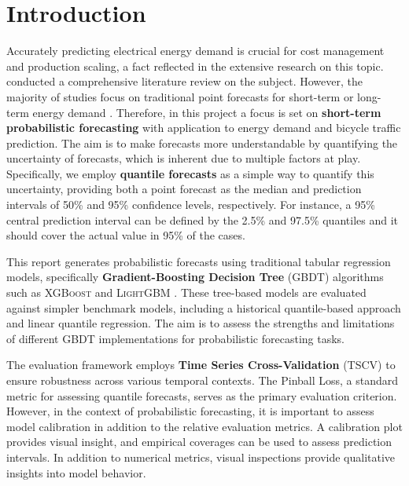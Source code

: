 \section{Introduction}
\label{ch:Introduction}

Accurately predicting electrical energy demand is crucial for cost management and production scaling, a fact reflected in the extensive research on this topic. \Cite{nti_electricity_2020} conducted a comprehensive literature review on the subject. However, the majority of studies focus on traditional point forecasts for short-term or long-term energy demand \parencite[915]{hong_probabilistic_2016}. Therefore, in this project a focus is set on \textbf{short-term probabilistic forecasting} with application to energy demand and bicycle traffic prediction. The aim is to make forecasts more understandable by quantifying the uncertainty of forecasts, which is inherent due to multiple factors at play. Specifically, we employ \textbf{quantile forecasts} as a simple way to quantify this uncertainty, providing both a point forecast as the median and prediction intervals of 50\% and 95\% confidence levels, respectively. For instance, a 95\% central prediction interval can be defined by the 2.5\% and 97.5\% quantiles and it should cover the actual value in 95\% of the cases.

This report generates probabilistic forecasts using traditional tabular regression models, specifically \textbf{Gradient-Boosting Decision Tree} (GBDT) algorithms such as \textsc{XGBoost} \parencite{chen_xgboost_2016} and \textsc{LightGBM} \parencite{ke_lightgbm_2017}. These tree-based models are evaluated against simpler benchmark models, including a historical quantile-based approach and linear quantile regression. The aim is to assess the strengths and limitations of different GBDT implementations for probabilistic forecasting tasks.

The evaluation framework employs \textbf{Time Series Cross-Validation} (TSCV) to ensure robustness across various temporal contexts. The Pinball Loss, a standard metric for assessing quantile forecasts, serves as the primary evaluation criterion. However, in the context of probabilistic forecasting, it is important to assess model calibration in addition to the relative evaluation metrics. A calibration plot provides visual insight, and empirical coverages can be used to assess prediction intervals.
In addition to numerical metrics, visual inspections provide qualitative insights into model behavior.

